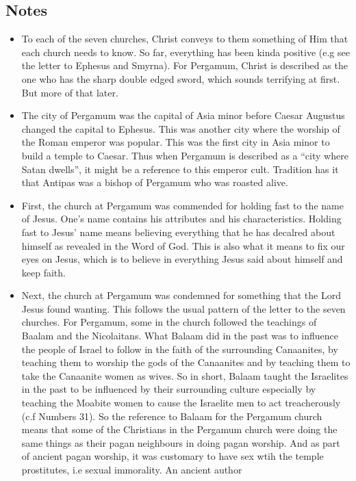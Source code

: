 \subsection*{Notes}
\begin{itemize}
  \item{To each of the seven churches, Christ conveys to them something of
  Him that each church needs to know.  So far, everything has been kinda
  positive (e.g see the letter to Ephesus and Smyrna).  For Pergamum, Christ
  is described as the one who has the sharp double edged sword, which sounds
  terrifying at first.  But more of that later.}
  \item{The city of Pergamum was the capital of Asia minor before Caesar
  Augustus changed the capital to Ephesus.  This was another city where the
  worship of the Roman emperor was popular.  This was the first city in Asia
  minor to build a temple to Caesar.  Thus when Pergamum is described as a
  ``city where Satan dwells'', it might be a reference to this emperor cult.
  Tradition has it that Antipas was a bishop of Pergamum who was roasted
  alive.}
  \item{First, the church at Pergamum was commended for holding fast to the
  name of Jesus.  One's name contains his attributes and his characteristics.
  Holding fast to Jesus' name means believing everything that he has decalred
  about himself as revealed in the Word of God.  This is also what it means
  to fix our eyes on Jesus, which is to believe in everything Jesus said
  about himself and keep faith.}
  \item{Next, the church at Pergamum was condemned for something that the
  Lord Jesus found wanting.  This follows the usual pattern of the letter to
  the seven churches.  For Pergamum, some in the church followed the
  teachings of Baalam and the Nicolaitans.  What Balaam did in the past was
  to influence the people of Israel to follow in the faith of the surrounding
  Canaanites, by teaching them to worship the gods of the Canaanites and by
  teaching them to take the Canaanite women as wives.  So in short, Balaam
  taught the Israelites in the past to be influenced by their surrounding
  culture especially by teaching the Moabite women to cause the Israelite men
  to act treacherously (c.f Numbers 31).  So the reference to Balaam for the
  Pergamum church means that some of the Christians in the Pergamum church
  were doing the same things as their pagan neighbours in doing pagan
  worship.  And as part of ancient pagan worship, it was customary to have
  sex wtih the temple prostitutes, i.e sexual immorality.  An ancient author
}
\end{itemize}
